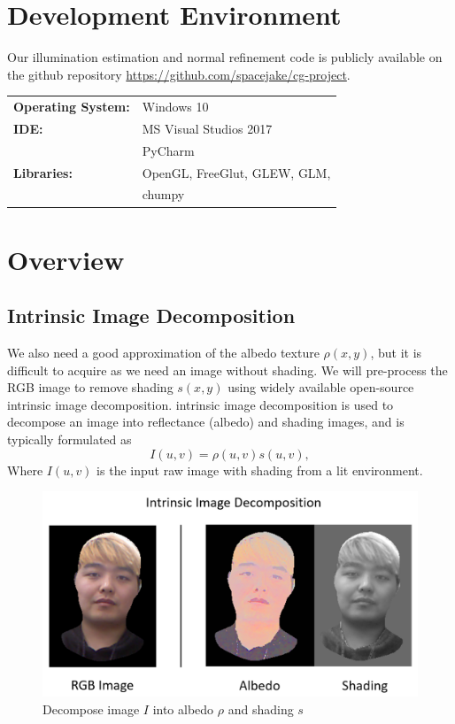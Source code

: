 \documentclass[10pt,twocolumn,letterpaper]{article}
\begin{document}
\section{Development Environment}
Our illumination estimation and normal refinement code is publicly available on the github repository \url{https://github.com/spacejake/cg-project}.
\begin{table}[h]
	\begin{tabular}{ll}
		\textbf{Operating System:} &  Windows 10  \\
		\textbf{IDE:} &  MS Visual Studios 2017  \\
        &PyCharm\\
		\textbf{Libraries:} &  OpenGL, FreeGlut, GLEW, GLM,\\
		&chumpy
	\end{tabular}
\end{table}

\section{Overview}
\subsection{Intrinsic Image Decomposition}
 We also need a good approximation of the albedo texture $\rho(x,y)$, but it is difficult to acquire as we need an image without shading. We will pre-process the RGB image to remove shading $s(x,y)$ using widely available open-source intrinsic image decomposition\cite{bell}. intrinsic image decomposition is used to decompose an image into reflectance (albedo) and shading images, and is typically formulated as 
\begin{equation}
I(u,v) = \rho(u,v)s(u,v),
\end{equation}
Where $I(u,v)$ is the input raw image with shading from a lit environment. 
\begin{figure}[!h]
    \begin{center}
        \includegraphics [scale=0.3] {image/intrinsic.png}
    \end{center}
    \caption{Decompose image $I$ into albedo $\rho$ and shading $s$}
    \label{fig:intrinsic}
\end{figure} 
\end{document}
